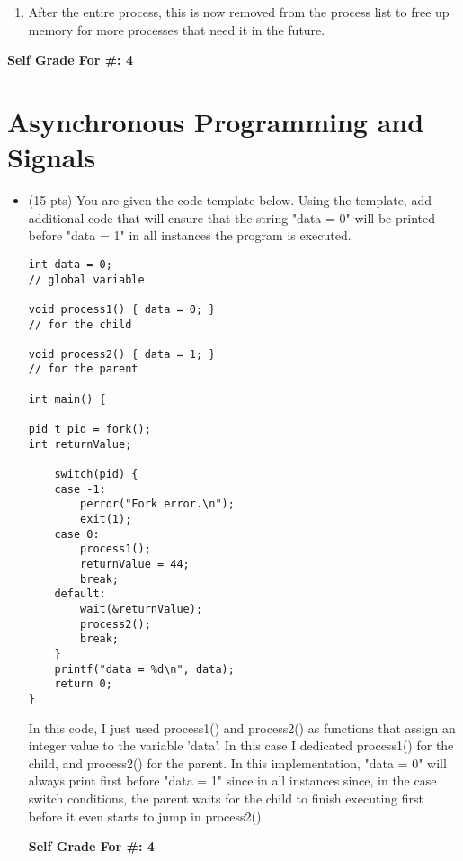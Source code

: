 \documentclass[conference]{IEEEtran}
\begin{document}
\begin{itemize}
\begin{itemize}
\begin{enumerate}
		\item After the entire process, this is now removed from the process list to free up memory for more processes that need it in the future.
		
		\end{enumerate}
		
		\begin{center}
			\textbf{Self Grade For \#: 4}
		\end{center}
	\end{itemize}
\end{itemize}
\section{Asynchronous Programming and Signals}
\begin{itemize}
\item (15 pts) You are given the code template below. Using the template, add additional code that will
ensure that the string "data = 0" will be printed before "data = 1" in all instances the program is
executed.
\begin{lstlisting}
int data = 0;
// global variable

void process1() { data = 0; }
// for the child

void process2() { data = 1; }
// for the parent

int main() {

pid_t pid = fork();
int returnValue;

    switch(pid) {
    case -1: 
        perror("Fork error.\n");
        exit(1);
    case 0:
        process1();
        returnValue = 44;
        break;
    default: 
        wait(&returnValue);
        process2();
        break;
    }
    printf("data = %d\n", data);
    return 0;
}
\end{lstlisting}
In this code, I just used process1() and process2() as functions that assign an integer value to the variable 'data'. In this case I dedicated process1() for the child, and process2() for the parent. In this implementation, "data = 0" will always print first before "data = 1" since in all instances since, in the case switch conditions, the parent waits for the child to finish executing first before it even starts to jump in process2().
\begin{center}
	\textbf{Self Grade For \#: 4}
\end{center}
\end{itemize}
\end{document}
